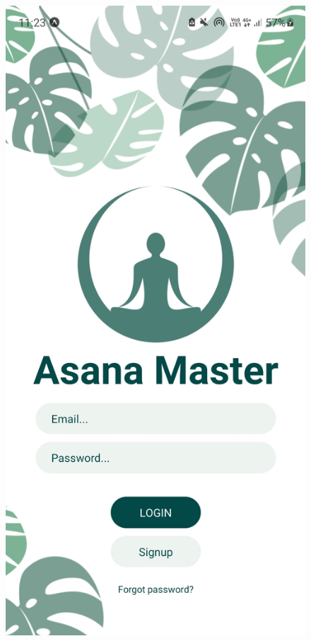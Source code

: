 \documentclass[a4paper, 12pt]{book}
\begin{document}
\begin{figure}[!tbp]
\centering
  \begin{minipage}[b]{0.35\textwidth}
    \includegraphics[width=\textwidth]{prijava.jpg}\centering

\end{minipage}
\end{figure}
\end{document}
